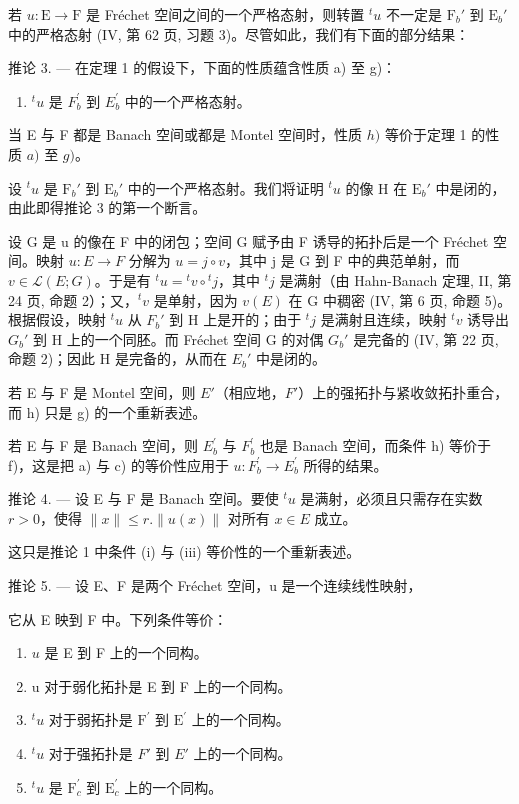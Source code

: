 若 \(u: \mathrm{E} \to \mathrm{F}\) 是 Fréchet 空间之间的一个严格态射，则转置 \({}^t u\) 不一定是 \(\mathrm{F}_b'\) 到 \(\mathrm{E}_b'\) 中的严格态射 (IV, 第 62 页, 习题 3)。尽管如此，我们有下面的部分结果：

推论 3. --- 在定理 1 的假设下，下面的性质蕴含性质 a) 至 g)：

\begin{enumerate}
\def\labelenumi{\alph{enumi})}
\setcounter{enumi}{7}
\tightlist
\item
  \({}^{t}u\) 是 \(F_{b}^{\prime}\) 到 \(E_{b}^{\prime}\) 中的一个严格态射。
\end{enumerate}

当 E 与 F 都是 Banach 空间或都是 Montel 空间时，性质 \(h)\) 等价于定理 1 的性质 \(a)\) 至 \(g)\)。

设 \({}^t u\) 是 \(\mathrm{F}_b'\) 到 \(\mathrm{E}_b'\) 中的一个严格态射。我们将证明 \({}^t u\) 的像 H 在 \(\mathrm{E}_b'\) 中是闭的，由此即得推论 3 的第一个断言。

设 G 是 u 的像在 F 中的闭包；空间 G 赋予由 F 诱导的拓扑后是一个 Fréchet 空间。映射 \(u: E \to F\) 分解为 \(u = j \circ v\)，其中 j 是 G 到 F 中的典范单射，而 \(v \in \mathcal{L}(E; G)\)。于是有 \({}^t u = {}^t v \circ {}^t j\)，其中 \({}^t j\) 是满射（由 Hahn-Banach 定理, II, 第 24 页, 命题 2）；又，\({}^t v\) 是单射，因为 \(v(E)\) 在 G 中稠密 (IV, 第 6 页, 命题 5)。根据假设，映射 \({}^t u\) 从 \(F_{b}'\) 到 H 上是开的；由于 \({}^t j\) 是满射且连续，映射 \({}^t v\) 诱导出 \(G_{b}'\) 到 H 上的一个同胚。而 Fréchet 空间 G 的对偶 \(G_{b}'\) 是完备的 (IV, 第 22 页, 命题 2)；因此 H 是完备的，从而在 \(E_{b}'\) 中是闭的。

若 E 与 F 是 Montel 空间，则 \(E'\)（相应地，\(F'\)）上的强拓扑与紧收敛拓扑重合，而 h) 只是 g) 的一个重新表述。

若 E 与 F 是 Banach 空间，则 \(E_{b}^{\prime}\) 与 \(F_{b}^{\prime}\) 也是 Banach 空间，而条件 h) 等价于 f)，这是把 a) 与 c) 的等价性应用于 \(u: F_{b}^{\prime} \to E_{b}^{\prime}\) 所得的结果。

推论 4. --- 设 E 与 F 是 Banach 空间。要使 \({}^t u\) 是满射，必须且只需存在实数 \(r > 0\)，使得 \(\| x\| \leqslant r.\| u(x)\|\) 对所有 \(x\in E\) 成立。

这只是推论 1 中条件 (i) 与 (iii) 等价性的一个重新表述。

推论 5. --- 设 E、F 是两个 Fréchet 空间，u 是一个连续线性映射，

它从 E 映到 F 中。下列条件等价：

\begin{enumerate}
\def\labelenumi{\alph{enumi})}
\item
  \(u\) 是 E 到 F 上的一个同构。
\item
  u 对于弱化拓扑是 E 到 F 上的一个同构。
\item
  \({}^t u\) 对于弱拓扑是 \({\mathrm{F}}^{\prime }\) 到 \({\mathrm{E}}^{\prime }\) 上的一个同构。
\item
  \({}^{t}u\) 对于强拓扑是 \(F'\) 到 \(E'\) 上的一个同构。
\item
  \({}^t u\) 是 \({\mathrm{F}}_{c}^{\prime }\) 到 \({\mathrm{E}}_{c}^{\prime }\) 上的一个同构。
\end{enumerate}

